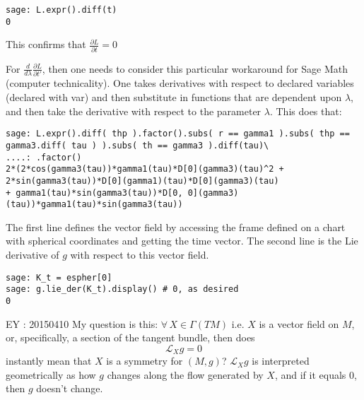 \begin{verbatim}
sage: L.expr().diff(t)
0
\end{verbatim}
This confirms that $\frac{ \partial L}{ \partial t} =0$

For $\frac{d}{d\lambda} \frac{ \partial L}{ \partial t'}$, then one needs to consider this particular workaround for Sage Math (computer technicality).  One takes derivatives with respect to declared variables (declared with var) and then substitute in functions that are dependent upon $\lambda$, and then take the derivative with respect to the parameter $\lambda$.  This does that:

{\scriptsize
\begin{verbatim}
sage: L.expr().diff( thp ).factor().subs( r == gamma1 ).subs( thp == gamma3.diff( tau ) ).subs( th == gamma3 ).diff(tau)\
....: .factor()
2*(2*cos(gamma3(tau))*gamma1(tau)*D[0](gamma3)(tau)^2 + 2*sin(gamma3(tau))*D[0](gamma1)(tau)*D[0](gamma3)(tau) 
+ gamma1(tau)*sin(gamma3(tau))*D[0, 0](gamma3)(tau))*gamma1(tau)*sin(gamma3(tau))
\end{verbatim} }


The first line defines the vector field by accessing the frame defined on a chart with spherical coordinates and getting the time vector.  The second line is the Lie derivative of $g$ with respect to this vector field.
\begin{verbatim}
sage: K_t = espher[0]
sage: g.lie_der(K_t).display() # 0, as desired
0
\end{verbatim}

EY : 20150410 My question is this: $\forall \, X \in \Gamma(TM)$ i.e. $X$ is a vector field on $M$, or, specifically, a section of the tangent bundle, then does
\[
\mathcal{L}_Xg = 0 
\]
instantly mean that $X$ is a symmetry for $(M,g)$?  $\mathcal{L}_Xg$ is interpreted geometrically as how $g$ changes along the flow generated by $X$, and if it equals $0$, then $g$ doesn't change.  

